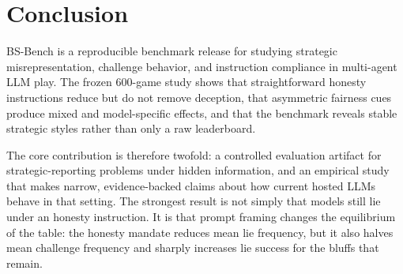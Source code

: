 \section{Conclusion}

BS-Bench is a reproducible benchmark release for studying strategic misrepresentation, challenge behavior, and instruction compliance in multi-agent LLM play. The frozen 600-game study shows that straightforward honesty instructions reduce but do not remove deception, that asymmetric fairness cues produce mixed and model-specific effects, and that the benchmark reveals stable strategic styles rather than only a raw leaderboard.

The core contribution is therefore twofold: a controlled evaluation artifact for strategic-reporting problems under hidden information, and an empirical study that makes narrow, evidence-backed claims about how current hosted LLMs behave in that setting. The strongest result is not simply that models still lie under an honesty instruction. It is that prompt framing changes the equilibrium of the table: the honesty mandate reduces mean lie frequency, but it also halves mean challenge frequency and sharply increases lie success for the bluffs that remain.
